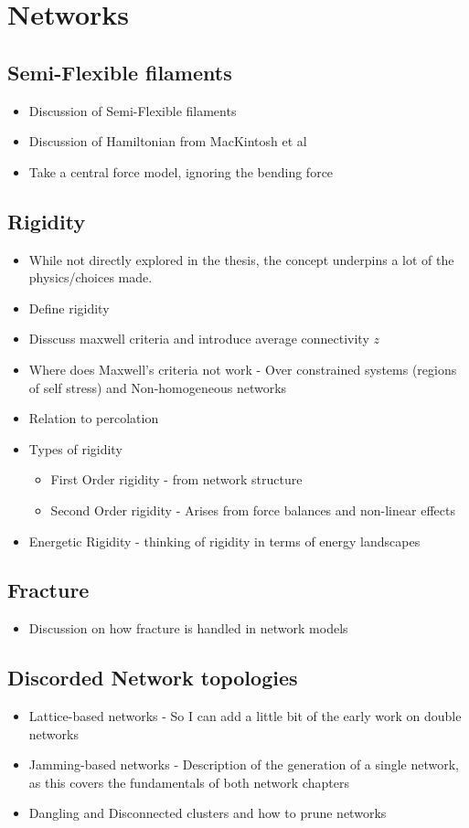 \documentclass{library/duthesis}
\begin{document}
\section{Networks}
\subsection{Semi-Flexible filaments}
\begin{itemize}
    \item Discussion of Semi-Flexible filaments
    \item Discussion of Hamiltonian from MacKintosh et al
    \item Take a central force model, ignoring the bending force
\end{itemize}
\subsection{Rigidity}
\begin{itemize}
    \item While not directly explored in the thesis, the concept underpins a lot of the physics/choices made. 
    \item Define rigidity
    \item Disscuss maxwell criteria and introduce average connectivity $z$
    \item Where does Maxwell's criteria not work - Over constrained systems (regions of self stress) and Non-homogeneous networks
    \item Relation to percolation
    \item Types of rigidity
    \begin{itemize}
        \item First Order rigidity - from network structure
        \item Second Order rigidity - Arises from force balances and non-linear effects
    \end{itemize}
    \item Energetic Rigidity - thinking of rigidity in terms of energy landscapes
\end{itemize}
\subsection{Fracture}
\begin{itemize}
    \item Discussion on how fracture is handled in network models
\end{itemize}
\subsection{Discorded Network topologies}
\begin{itemize}
    \item Lattice-based networks - So I can add a little bit of the early work on double networks
    \item Jamming-based networks - Description of the generation of a single network, as this covers the fundamentals of both network chapters
    \item Dangling and Disconnected clusters and how to prune networks
\end{itemize}
\end{document}
